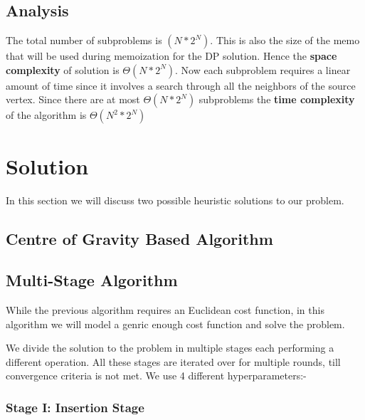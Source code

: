 \documentclass{article}
\begin{document}
\subsection{Analysis}

The total number of subproblems is $(N*2^N)$. This is also the size of the memo that will be used during memoization for the DP solution.
Hence the \textbf{space complexity} of solution is $\Theta(N*2^N)$. Now each subproblem requires a linear amount of time since it involves a 
search through all the neighbors of the source vertex. Since there are at most $\Theta(N*2^N)$ subproblems the \textbf{time complexity} of the 
algorithm is $\Theta(N^2*2^N)$





\section{Solution}

In this section we will discuss two possible heuristic solutions to our problem. 

\subsection{Centre of Gravity Based Algorithm}


\subsection{Multi-Stage Algorithm}

While the previous algorithm requires an Euclidean cost function, in this algorithm we will model a genric enough cost function and solve the problem.

We divide the solution to the problem in multiple stages each performing a different operation. All these stages are iterated over for multiple rounds, till convergence criteria is not met.
We use 4 different hyperparameters:- %

\subsubsection{Stage I: Insertion Stage}
\end{document}
